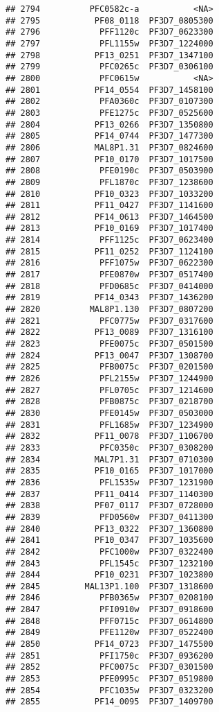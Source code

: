 \documentclass{article}\usepackage[]{graphicx}\usepackage[]{color}
\makeatletter
\newenvironment{kframe}{%
 \def\at@end@of@kframe{}%
 \ifinner\ifhmode%
  \def\at@end@of@kframe{\end{minipage}}%
  \begin{minipage}{\columnwidth}%
 \fi\fi%
 \def\FrameCommand##1{\hskip\@totalleftmargin \hskip-\fboxsep
 \colorbox{shadecolor}{##1}\hskip-\fboxsep
     \hskip-\linewidth \hskip-\@totalleftmargin \hskip\columnwidth}%
 \MakeFramed {\advance\hsize-\width
   \@totalleftmargin\z@ \linewidth\hsize
   \@setminipage}}%
 {\par\unskip\endMakeFramed%
 \at@end@of@kframe}
\newenvironment{knitrout}{}{} %
\makeatother
\begin{document}
\begin{knitrout}
\begin{kframe}
\begin{verbatim}
## 2794          PFC0582c-a           <NA>
## 2795           PF08_0118  PF3D7_0805300
## 2796            PFF1120c  PF3D7_0623300
## 2797            PFL1155w  PF3D7_1224000
## 2798           PF13_0251  PF3D7_1347100
## 2799            PFC0265c  PF3D7_0306100
## 2800            PFC0615w           <NA>
## 2801           PF14_0554  PF3D7_1458100
## 2802            PFA0360c  PF3D7_0107300
## 2803            PFE1275c  PF3D7_0525600
## 2804           PF13_0266  PF3D7_1350800
## 2805           PF14_0744  PF3D7_1477300
## 2806           MAL8P1.31  PF3D7_0824600
## 2807           PF10_0170  PF3D7_1017500
## 2808            PFE0190c  PF3D7_0503900
## 2809            PFL1870c  PF3D7_1238600
## 2810           PF10_0323  PF3D7_1033200
## 2811           PF11_0427  PF3D7_1141600
## 2812           PF14_0613  PF3D7_1464500
## 2813           PF10_0169  PF3D7_1017400
## 2814            PFF1125c  PF3D7_0623400
## 2815           PF11_0252  PF3D7_1124100
## 2816            PFF1075w  PF3D7_0622300
## 2817            PFE0870w  PF3D7_0517400
## 2818            PFD0685c  PF3D7_0414000
## 2819           PF14_0343  PF3D7_1436200
## 2820          MAL8P1.130  PF3D7_0807200
## 2821            PFC0775w  PF3D7_0317600
## 2822           PF13_0089  PF3D7_1316100
## 2823            PFE0075c  PF3D7_0501500
## 2824           PF13_0047  PF3D7_1308700
## 2825            PFB0075c  PF3D7_0201500
## 2826            PFL2155w  PF3D7_1244900
## 2827            PFL0705c  PF3D7_1214600
## 2828            PFB0875c  PF3D7_0218700
## 2830            PFE0145w  PF3D7_0503000
## 2831            PFL1685w  PF3D7_1234900
## 2832           PF11_0078  PF3D7_1106700
## 2833            PFC0350c  PF3D7_0308200
## 2834           MAL7P1.31  PF3D7_0710300
## 2835           PF10_0165  PF3D7_1017000
## 2836            PFL1535w  PF3D7_1231900
## 2837           PF11_0414  PF3D7_1140300
## 2838           PF07_0117  PF3D7_0728000
## 2839            PFD0560w  PF3D7_0411300
## 2840           PF13_0322  PF3D7_1360800
## 2841           PF10_0347  PF3D7_1035600
## 2842            PFC1000w  PF3D7_0322400
## 2843            PFL1545c  PF3D7_1232100
## 2844           PF10_0231  PF3D7_1023800
## 2845         MAL13P1.100  PF3D7_1318600
## 2846            PFB0365w  PF3D7_0208100
## 2847            PFI0910w  PF3D7_0918600
## 2848            PFF0715c  PF3D7_0614800
## 2849            PFE1120w  PF3D7_0522400
## 2850           PF14_0723  PF3D7_1475500
## 2851            PFI1750c  PF3D7_0936200
## 2852            PFC0075c  PF3D7_0301500
## 2853            PFE0995c  PF3D7_0519800
## 2854            PFC1035w  PF3D7_0323200
## 2855           PF14_0095  PF3D7_1409700

\end{verbatim}
\end{kframe}
\end{knitrout}
\end{document}
